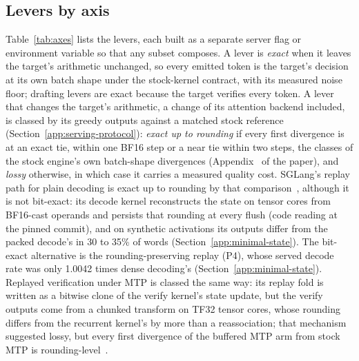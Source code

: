 \subsection{Levers by axis}\label{app:levers}\label{sec:stack-levers}
Table~\ref{tab:axes} lists the levers, each built as a separate server flag or environment variable so that any subset composes. A lever is \emph{exact} when it leaves the target's arithmetic unchanged, so every emitted token is the target's decision at its own batch shape under the stock-kernel contract, with its measured noise floor; drafting levers are exact because the target verifies every token. A lever that changes the target's arithmetic, a change of its attention backend included, is classed by its greedy outputs against a matched stock reference (Section~\ref{app:serving-protocol}): \emph{exact up to rounding} if every first divergence is at an exact tie, within one BF16 step or a near tie within two steps, the classes of the stock engine's own batch-shape divergences (Appendix~ of the paper), and \emph{lossy} otherwise, in which case it carries a measured quality cost. SGLang's replay path for plain decoding is exact up to rounding by that comparison~, although it is not bit-exact: its decode kernel reconstructs the state on tensor cores from BF16-cast operands and persists that rounding at every flush (code reading at the pinned commit), and on synthetic activations its outputs differ from the packed decode's in 30 to 35\% of words (Section~\ref{app:minimal-state}). The bit-exact alternative is the rounding-preserving replay (P4), whose served decode rate was only 1.0042 times dense decoding's (Section~\ref{app:minimal-state}). Replayed verification under MTP is classed the same way: its replay fold is written as a bitwise clone of the verify kernel's state update, but the verify outputs come from a chunked transform on TF32 tensor cores, whose rounding differs from the recurrent kernel's by more than a reassociation; that mechanism suggested lossy, but every first divergence of the buffered MTP arm from stock MTP is rounding-level~.

